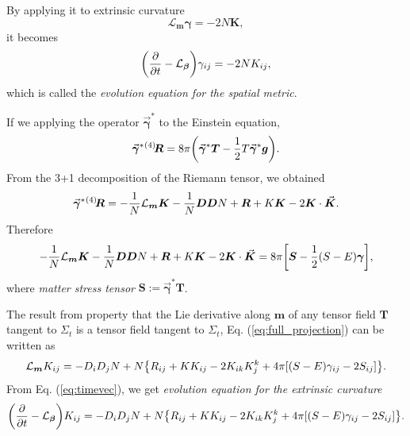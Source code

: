By applying it to extrinsic curvature
\begin{equation}
	\mathcal{L}_{\bm{m}} \bm{\gamma} = -2N \bm{K},
\end{equation}
it becomes
\begin{equation}
	\qty(\pdv{t} - \mathcal{L}_{\bm{\beta}})\gamma_{ij} = -2NK_{ij},
\end{equation}
which is called the \emph{evolution equation for the spatial metric}.

If we applying the operator $\vec{\bm{\gamma}}^{\ast}$ to the Einstein equation,
\begin{equation}
	\vec{\bm{\gamma}}^{\ast} {}^{(4)}\hspace{-0.2em} \bm{R} = 8 \pi \qty( \vec{\bm{\gamma}}^{\ast} \bm{T} - \frac{1}{2}T \vec{\bm{\gamma}}^{\ast} \bm{g}).
\end{equation}
From the 3+1 decomposition of the Riemann tensor, we obtained
\begin{equation}
	\vec{\bm{\gamma}}^{\ast} {}^{(4)}\hspace{-0.2em} \bm{R} = -\frac{1}{N} \mathcal{L}_{\bm{m}} \bm{K}- \frac{1}{N}\bm{D}\bm{D} N + \bm{R} + K \bm{K} - 2 \bm{K} \cdot \vec{\bm{K}}.
\end{equation}
Therefore
\begin{equation}
	\label{eq:full_projection}
	- \frac{1}{N} \mathcal{L}_{\bm{m}}\bm{K} - \frac{1}{N}\bm{D}\bm{D}N + \bm{R} + K \bm{K} - 2\bm{K}\cdot \vec{\bm{K}} = 8 \pi \qty [\bm{S} - \frac{1}{2}(S-E)\bm{\gamma}],
\end{equation}
where \emph{matter stress tensor} $\bm{S}:= \vec{\bm{\gamma}}^{\ast} \bm{T}$.

The result from property that the Lie derivative along $\bm{m}$ of any tensor field $\bm{T}$ tangent to $\Sigma_t$ is a tensor field tangent to $\Sigma_t$, Eq. (\ref{eq:full_projection}) can be written as
\begin{equation}
	\mathcal{L}_{\bm{m}}K_{ij} =  -D_i D_j N + N\qty{ R_{ij} + KK_{ij} - 2K_{ik}K^k_j +4\pi \qty[(S-E)\gamma_{ij}-2S_{ij}]}.
\end{equation}
From Eq. (\ref{eq:timevec}), we get \emph{evolution equation for the extrinsic curvature}
\begin{equation}
	\qty(\pdv{t} - \mathcal{L}_{\bm{\beta}})K_{ij} = -D_i D_j N + N\qty{ R_{ij} + KK_{ij} - 2K_{ik}K^k_j +4\pi \qty[(S-E)\gamma_{ij}-2S_{ij}]}.
\end{equation}

